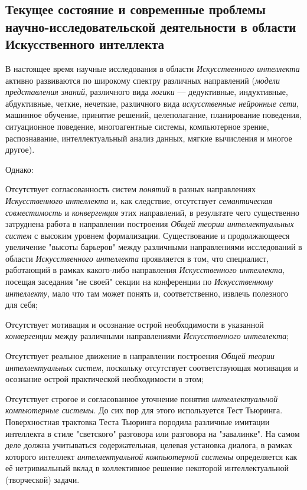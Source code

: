 \subsection{Текущее состояние и современные проблемы научно-исследовательской деятельности в области Искусственного интеллекта}
\label{subsec_current_state_and_modern_problems_research_activities}

В настоящее время научные исследования в области \textit{Искусственного интеллекта} активно развиваются по широкому спектру различных направлений (\textit{модели представления знаний}, различного вида \textit{логики} --- дедуктивные, индуктивные, абдуктивные, четкие, нечеткие, различного вида \textit{искусственные нейронные сети}, машинное обучение, принятие решений, целеполагание, планирование поведения, ситуационное поведение, многоагентные системы, компьютерное зрение, распознавание, интеллектуальный анализ данных, мягкие вычисления и многое другое).

Однако:

\begin{textitemize}
	\item
	Отсутствует согласованность систем \textit{понятий} в разных направлениях \textit{Искусственного интеллекта} и, как следствие, отсутствует \textit{семантическая совместимость} и \textit{конвергенция} этих направлений, в результате чего существенно затруднена работа в направлении построения \textit{Общей теории интеллектуальных систем} с высоким уровнем формализации. Существование и продолжающееся увеличение "высоты барьеров" между различными направлениями исследований в области \textit{Искусственного интеллекта} проявляется в том, что специалист, работающий в рамках какого-либо направления \textit{Искусственного интеллекта}, посещая заседания "не своей" секции на конференции по \textit{Искусственному интеллекту}, мало что там может понять и, соответственно, извлечь полезного для себя;
	\item
	Отсутствует мотивация и осознание острой необходимости в указанной \textit{конвергенции} между различными направлениями \textit{Искусственного интеллекта};
	\item
	Отсутствует реальное движение в направлении построения \textit{Общей теории интеллектуальных систем}, поскольку отсутствует соответствующая мотивация и осознание острой практической необходимости в этом;
	\item
	Отсутствует строгое и согласованное уточнение понятия \textit{интеллектуальной компьютерные системы}. До сих пор для этого используется Тест Тьюринга. Поверхностная трактовка Теста Тьюринга породила различные имитации интеллекта в стиле "светского"{} разговора или разговора на "завалинке"{}. На самом деле должна учитываться содержательная, целевая установка диалога, в рамках которого интеллект \textit{интеллектуальной компьютерной системы} определяется как её нетривиальный вклад в коллективное решение некоторой интеллектуальной (творческой) задачи.
\end{textitemize}

